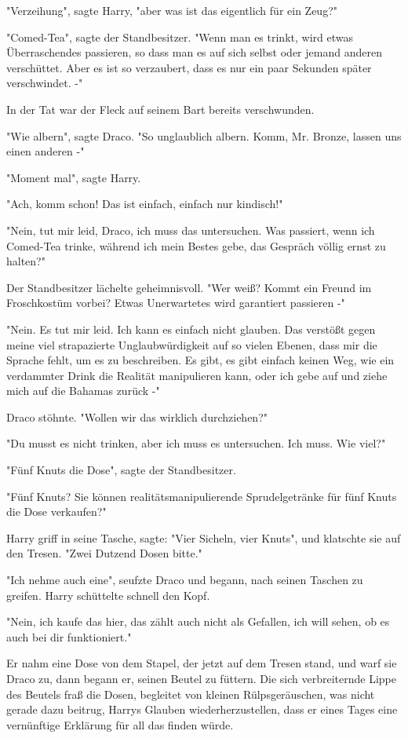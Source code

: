 {"Verzeihung", sagte Harry, "aber was ist das eigentlich für ein Zeug?"

"Comed-Tea", sagte der Standbesitzer. "Wenn man es trinkt, wird etwas Überraschendes passieren, so dass man es auf sich selbst oder jemand anderen verschüttet. Aber es ist so verzaubert, dass es nur ein paar Sekunden später verschwindet. -"

In der Tat war der Fleck auf seinem Bart bereits verschwunden.

"Wie albern", sagte Draco. "So unglaublich albern. Komm, Mr. Bronze, lassen uns einen anderen -"

"Moment mal", sagte Harry.

"Ach, komm schon! Das ist einfach, einfach nur kindisch!"

"Nein, tut mir leid, Draco, ich muss das untersuchen. Was passiert, wenn ich Comed-Tea trinke, während ich mein Bestes gebe, das Gespräch völlig ernst zu halten?"

Der Standbesitzer lächelte geheimnisvoll. "Wer weiß? Kommt ein Freund im Froschkostüm vorbei? Etwas Unerwartetes wird garantiert passieren -"

"Nein. Es tut mir leid. Ich kann es einfach nicht glauben. Das verstößt gegen meine viel strapazierte Unglaubwürdigkeit auf so vielen Ebenen, dass mir die Sprache fehlt, um es zu beschreiben. Es gibt, es gibt einfach keinen Weg, wie ein verdammter Drink die Realität manipulieren kann, oder ich gebe auf und ziehe mich auf die Bahamas zurück -"

Draco stöhnte. "Wollen wir das wirklich durchziehen?"

"Du musst es nicht trinken, aber ich muss es untersuchen. Ich muss. Wie viel?"

"Fünf Knuts die Dose", sagte der Standbesitzer.

"Fünf Knuts? Sie können realitätsmanipulierende Sprudelgetränke für fünf Knuts die Dose verkaufen?"

Harry griff in seine Tasche, sagte: "Vier Sicheln, vier Knuts", und klatschte sie auf den Tresen. "Zwei Dutzend Dosen bitte."

"Ich nehme auch eine", seufzte Draco und begann, nach seinen Taschen zu greifen. Harry schüttelte schnell den Kopf.

"Nein, ich kaufe das hier, das zählt auch nicht als Gefallen, ich will sehen, ob es auch bei dir funktioniert."

Er nahm eine Dose von dem Stapel, der jetzt auf dem Tresen stand, und warf sie Draco zu, dann begann er, seinen Beutel zu füttern. Die sich verbreiternde Lippe des Beutels fraß die Dosen, begleitet von kleinen Rülpsgeräuschen, was nicht gerade dazu beitrug, Harrys Glauben wiederherzustellen, dass er eines Tages eine vernünftige Erklärung für all das finden würde.

}

